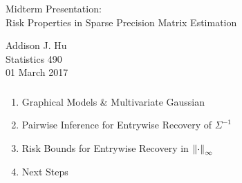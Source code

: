 
\newcommand{\blueone}{{\color{yaleblue} 1}}
\newcommand{\greyzero}{{\color{solarized@base00} 0}}
\usepackage{sty/personalmacros}
\usepackage{sty/personalslides}


\begin{frame}[fragile] \frametitle{}
\vfill
\vspace{0.2cm}
{
    \color{yaleblue}
    \fontsize{0.5cm}{0cm}\selectfont
    Midterm Presentation: \\
}
\vspace{1.0cm}
{
    \fontsize{0.7cm}{0cm}\selectfont
    Risk Properties in Sparse Precision Matrix Estimation\\
}

\hfill

\vspace{1.8cm}
\begin{minipage}{1.0\textwidth}\raggedleft
    \color{yaleblue}
    Addison J. Hu   \\
    Statistics 490 \\
    01 March 2017
\end{minipage}
\end{frame}
\begin{frame}[fragile] \frametitle{}
    \begin{enumerate}
        \item Graphical Models \& Multivariate Gaussian
        \item Pairwise Inference for Entrywise Recovery of $\Sigma^{-1}$
        \item Risk Bounds for Entrywise Recovery in $\left\lVert\cdot\right\rVert_\infty$
        \item Next Steps
    \end{enumerate}
\end{frame}
